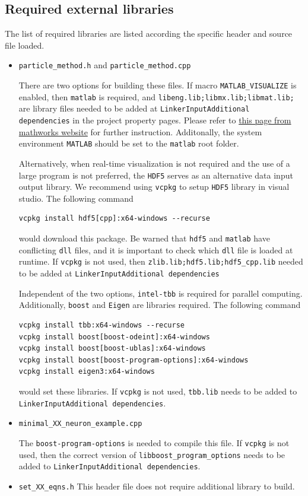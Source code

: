 \documentclass[10pt]{article} %
\begin{document}
\subsection{Required external libraries}
The list of required libraries are listed according the specific header and source file loaded. 
\begin{itemize}
\item
\texttt{particle\_method.h} and \texttt{particle\_method.cpp}

There are two options for building these files. If macro \texttt{MATLAB\_VISUALIZE} is enabled, then \texttt{matlab} is required, and \texttt{libeng.lib;libmx.lib;libmat.lib;} are library files needed to be added at \texttt{Linker\textrightarrow Input\textrightarrow Additional dependencies} in the project property pages. Please refer to \href{www.mathworks.com/matlabcentral/answers/406574-how-can-i-compile-a-c-program-that-uses-matlab-engine-c-api-in-visual-studio-2017}{this page from mathworks website} for further instruction. Additonally, the system environment \texttt{MATLAB} should be set to the \texttt{matlab} root folder.

Alternatively, when real-time visualization is not required and the use of a large program is not preferred, the \texttt{HDF5} serves as an alternative data input output library. We recommend using \texttt{vcpkg} to setup \texttt{HDF5} library in visual studio. The following command
\begin{lstlisting}
vcpkg install hdf5[cpp]:x64-windows --recurse
\end{lstlisting}
  would download this package. Be warned that \texttt{hdf5} and \texttt{matlab} have conflicting \texttt{dll} files, and it is important to check which \texttt{dll} file is loaded at runtime. If \texttt{vcpkg} is not used, then \texttt{zlib.lib;hdf5.lib;hdf5\_cpp.lib} needed to be added at \texttt{Linker\textrightarrow Input\textrightarrow Additional dependencies}

Independent of the two options, \texttt{intel-tbb} is required for parallel computing. Additionally, \texttt{boost} and \texttt{Eigen} are libraries required. The following command
\begin{lstlisting}
vcpkg install tbb:x64-windows --recurse
vcpkg install boost[boost-odeint]:x64-windows
vcpkg install boost[boost-ublas]:x64-windows
vcpkg install boost[boost-program-options]:x64-windows
vcpkg install eigen3:x64-windows
\end{lstlisting}

would set these libraries. If \texttt{vcpkg} is not used, \texttt{tbb.lib} needs to be added to \texttt{Linker\textrightarrow Input\textrightarrow Additional dependencies}.

\item
\texttt{minimal\_XX\_neuron\_example.cpp}

The \texttt{boost-program-options} is needed to compile this file. If \texttt{vcpkg} is not used, then the correct version of \texttt{libboost\_program\_options} needs to be added to \texttt{Linker\textrightarrow Input\textrightarrow Additional dependencies}.
\item
\texttt{set\_XX\_eqns.h}
This header file does not require additional library to build.
\end{itemize}
\end{document}
